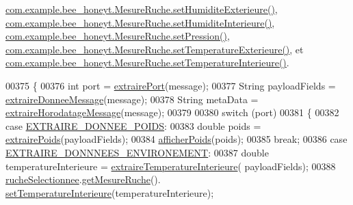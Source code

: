 \hyperlink{_mesure_ruche_8java_source_l00087}{com.\+example.\+bee\+\_\+honeyt.\+Mesure\+Ruche.\+set\+Humidite\+Exterieure()}, \hyperlink{_mesure_ruche_8java_source_l00077}{com.\+example.\+bee\+\_\+honeyt.\+Mesure\+Ruche.\+set\+Humidite\+Interieure()}, \hyperlink{_mesure_ruche_8java_source_l00097}{com.\+example.\+bee\+\_\+honeyt.\+Mesure\+Ruche.\+set\+Pression()}, \hyperlink{_mesure_ruche_8java_source_l00067}{com.\+example.\+bee\+\_\+honeyt.\+Mesure\+Ruche.\+set\+Temperature\+Exterieure()}, et \hyperlink{_mesure_ruche_8java_source_l00057}{com.\+example.\+bee\+\_\+honeyt.\+Mesure\+Ruche.\+set\+Temperature\+Interieure()}.


\begin{DoxyCode}
00375     \{
00376         \textcolor{keywordtype}{int} port = \hyperlink{classcom_1_1example_1_1bee__honeyt_1_1_i_h_m_mobile_abc4571bc8b1400c6d75c0a2594b0abe6}{extrairePort}(message);
00377         String payloadFields = \hyperlink{classcom_1_1example_1_1bee__honeyt_1_1_i_h_m_mobile_a2f781039138b814510102847e70917a1}{extraireDonneeMessage}(message);
00378         String metaData = \hyperlink{classcom_1_1example_1_1bee__honeyt_1_1_i_h_m_mobile_aabe15decc02b7f56a82f60dac75f8c2f}{extraireHorodatageMessage}(message);
00379 
00380         \textcolor{keywordflow}{switch} (port)
00381         \{
00382             \textcolor{keywordflow}{case} \hyperlink{classcom_1_1example_1_1bee__honeyt_1_1_i_h_m_mobile_a2e9be0481d1498b9883b92bcb4d51619}{EXTRAIRE\_DONNEE\_POIDS}:
00383                 \textcolor{keywordtype}{double} poids = \hyperlink{classcom_1_1example_1_1bee__honeyt_1_1_i_h_m_mobile_ad702e818ba1d861f26accfd6a0194b86}{extrairePoids}(payloadFields);
00384                 \hyperlink{classcom_1_1example_1_1bee__honeyt_1_1_i_h_m_mobile_a2f4fe6cded3a35b0152e43d546be5565}{afficherPoids}(poids);
00385                 \textcolor{keywordflow}{break};
00386             \textcolor{keywordflow}{case} \hyperlink{classcom_1_1example_1_1bee__honeyt_1_1_i_h_m_mobile_aea71e02f7d7a9a5767821ba3803bdd80}{EXTRAIRE\_DONNNEES\_ENVIRONEMENT}:
00387                 \textcolor{keywordtype}{double} temperatureInterieure = \hyperlink{classcom_1_1example_1_1bee__honeyt_1_1_i_h_m_mobile_a714f52f4793f22a08a773b1bf35dd015}{extraireTemperatureInterieure}(
      payloadFields);
00388                 \hyperlink{classcom_1_1example_1_1bee__honeyt_1_1_i_h_m_mobile_af59d4b185d3931df2e98568e99673778}{rucheSelectionnee}.\hyperlink{classcom_1_1example_1_1bee__honeyt_1_1_ruche_afab94785f8af31f6ce436394ab41c9f3}{getMesureRuche}().
      \hyperlink{classcom_1_1example_1_1bee__honeyt_1_1_mesure_ruche_a5364a38970b37df66bb8cb6f5b3d3741}{setTemperatureInterieure}(temperatureInterieure);

\end{DoxyCode}
